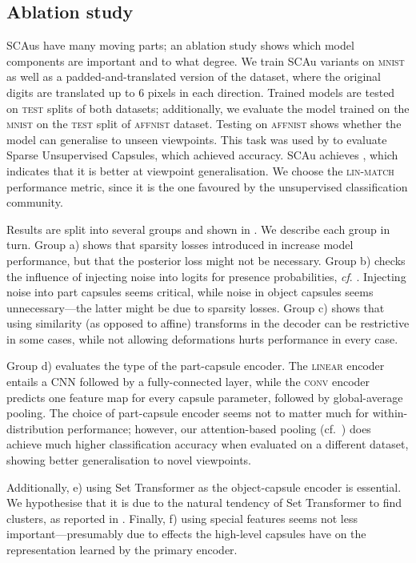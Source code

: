 \documentclass{article}
\begin{document}
\subsection{Ablation study}
\label{sec:ablation}
\gls{SCAu}s have many moving parts;
an ablation study shows which model components are important and to what degree.
We train \gls{SCAu} variants on \textsc{mnist} as well as a padded-and-translated  version of the dataset, where the original digits are translated up to 6 pixels in each direction.
Trained models are tested on \textsc{test} splits of both datasets; additionally, we evaluate the model trained on the  \textsc{mnist} on the \textsc{test} split of \textsc{affnist} dataset.
Testing on \textsc{affnist} shows whether the model can generalise to unseen viewpoints.
This task was used by \cite{Rawlinson2018sparsecaps} to evaluate Sparse Unsupervised Capsules, which achieved  accuracy. \Gls{SCAu} achieves , which indicates that it is better at viewpoint generalisation.
We choose the \textsc{lin-match} performance metric, since it is the one favoured by the unsupervised classification community.

Results are split into several groups and shown in .
We describe each group in turn.
Group a) shows that sparsity losses introduced in  increase model performance, but that the posterior loss might not be necessary.
Group b) checks the influence of injecting noise into logits for presence probabilities, \textit{cf}. .  Injecting noise into part capsules seems critical, while noise in object capsules seems unnecessary---the latter might be due to sparsity losses.
Group c) shows that using similarity (as opposed to affine) transforms in the decoder can be restrictive in some cases, while not allowing deformations hurts performance in every case.

Group d) evaluates the type of the part-capsule encoder.
The \textsc{linear} encoder entails a \gls{CNN} followed by a fully-connected layer, while the \textsc{conv} encoder predicts one feature map for every capsule parameter, followed by global-average pooling. 
The choice of part-capsule encoder seems not to matter much for within-distribution performance; however, our attention-based pooling (cf.\ ) does achieve much higher classification accuracy when evaluated on a different dataset, showing better generalisation to novel viewpoints.

Additionally, e) using Set Transformer as the object-capsule encoder is essential.
We hypothesise that it is due to the natural tendency of Set Transformer to find clusters, as reported in \cite{Lee2019set}.
Finally, f) using special features  seems not less important---presumably due to effects the high-level capsules have on the representation learned by the primary encoder.
\end{document}
